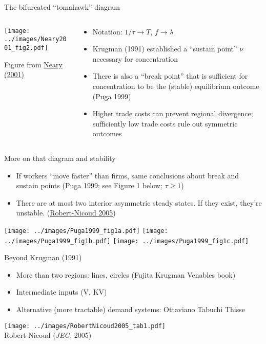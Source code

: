 \documentclass[11pt,notes=hide,aspectratio=169]{beamer}
\begin{document}
\begin{frame}{The bifurcated ``tomahawk'' diagram}
\begin{columns}
\begin{column}{.45\textwidth}
\texttt{[image: ../images/Neary2001\_fig2.pdf]}
\begin{center}
{\footnotesize Figure from \href{https://www.aeaweb.org/articles?id=10.1257/jel.39.2.536}{Neary (2001)}}
\end{center}
\end{column}
\begin{column}{.53\textwidth}
\begin{itemize}
	\item {\small Notation: $1/\tau \to T$, $f \to \lambda$}
	\item Krugman (1991) established a ``sustain point'' $\nu$ necessary for concentration
	\item There is also a ``break point'' that is sufficient for concentration to be the (stable) equilibrium outcome (Puga 1999)
	\item Higher trade costs can prevent regional divergence; sufficiently low trade costs rule out symmetric outcomes
\end{itemize}
\vfill
\end{column}
\end{columns}
\end{frame}
\begin{frame}{More on that diagram and stability}
\begin{itemize}
	\item If workers ``move faster'' than firms, same conclusions about break and sustain points (Puga 1999; see Figure 1 below; $\tau \geq 1$)
	\item There are at most two interior asymmetric steady states. If they exist, they're unstable. (\href{https://ideas.repec.org/a/oup/jecgeo/v5y2005i2p201-234.html}{Robert-Nicoud 2005})
\end{itemize}
\texttt{[image: ../images/Puga1999\_fig1a.pdf]}
\texttt{[image: ../images/Puga1999\_fig1b.pdf]}
\texttt{[image: ../images/Puga1999\_fig1c.pdf]}
\end{frame}
\begin{frame}{Beyond Krugman (1991)}
\begin{itemize}
	\item More than two regions: lines, circles (Fujita Krugman Venables book)
	\item Intermediate inputs (V, KV)
	\item Alternative (more tractable) demand systems: Ottaviano Tabuchi Thisse
\end{itemize}
\begin{center}
\texttt{[image: ../images/RobertNicoud2005\_tab1.pdf]} \\
\vspace{-2mm}
{\footnotesize Robert-Nicoud (\textit{JEG}, 2005)}
\end{center}
\end{frame}
\end{document}
